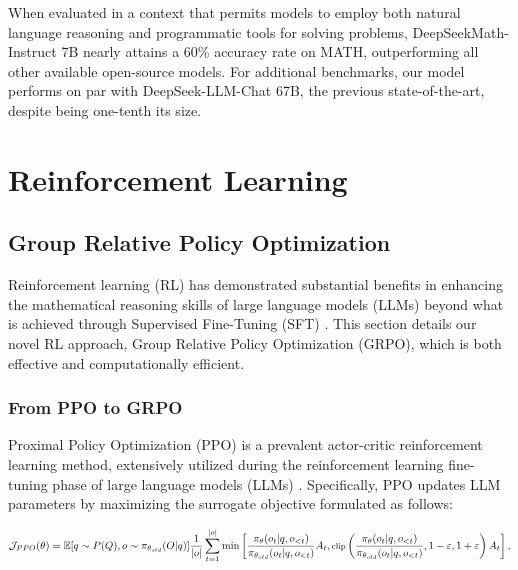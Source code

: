 \begin{itemize}[topsep=0pt]
When evaluated in a context that permits models to employ both natural language reasoning and programmatic tools for solving problems, DeepSeekMath-Instruct 7B nearly attains a 60\% accuracy rate on MATH, outperforming all other available open-source models. For additional benchmarks, our model performs on par with DeepSeek-LLM-Chat 67B, the previous state-of-the-art, despite being one-tenth its size.

\section{Reinforcement Learning}

\subsection{Group Relative Policy Optimization} Reinforcement learning (RL) has demonstrated substantial benefits in enhancing the mathematical reasoning skills of large language models (LLMs) beyond what is achieved through Supervised Fine-Tuning (SFT) \citep{wang2023math,wizardmath}. This section details our novel RL approach, Group Relative Policy Optimization (GRPO), which is both effective and computationally efficient.

\subsubsection{From PPO to GRPO} Proximal Policy Optimization (PPO) \citep{schulman2017proximal} is a prevalent actor-critic reinforcement learning method, extensively utilized during the reinforcement learning fine-tuning phase of large language models (LLMs) \citep{ouyang2022training}. Specifically, PPO updates LLM parameters by maximizing the surrogate objective formulated as follows:

\begin{equation}
\footnotesize
    \mathcal{J}_{PPO}(\theta) = \mathbb{E}{[q \sim P(Q), o \sim \pi_{\theta_{old}}(O|q)]} \frac{1}{|o|} \sum_{t=1}^{|o|} \min \left[ \frac{\pi_\theta(o_{t} | q, o_{<t})}{\pi_{\theta_{old}}(o_{t} | q, o_{<t})} A_{t}, \text{clip} \left( \frac{\pi_\theta(o_{t} | q, o_{<t})}{\pi_{\theta_{old}}(o_{t} | q, o_{<t})}, 1 - \varepsilon, 1 + \varepsilon \right)  A_{t} \right] ,
\end{equation}


\end{itemize}
